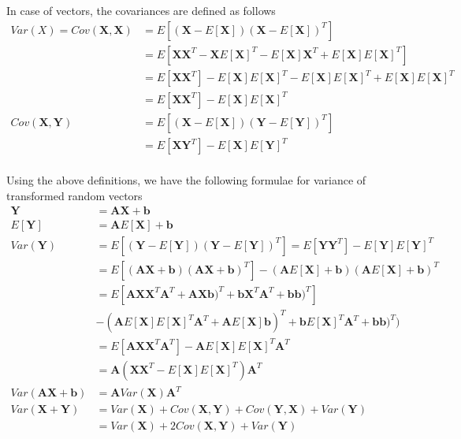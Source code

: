 \documentclass[../probability-notes.tex]{subfiles}
\begin{document}
    In case of vectors, the covariances are defined as follows
    \begin{align*}
        Var(X) = Cov(\mathbf{X}, \mathbf{X}) &= E[(\mathbf{X} - E[\mathbf{X}])(\mathbf{X} - E[\mathbf{X}])^{T}]\\
        &= E[\mathbf{X}\mathbf{X}^{T} - \mathbf{X}E[\mathbf{X}]^{T} - E[\mathbf{X}]\mathbf{X}^{T} + E[\mathbf{X}]E[\mathbf{X}]^{T}]\\
        &= E[\mathbf{X}\mathbf{X}^{T}] - E[\mathbf{X}]E[\mathbf{X}]^{T} - E[\mathbf{X}]E[\mathbf{X}]^{T} + E[\mathbf{X}]E[\mathbf{X}]^{T}\\
        &= E[\mathbf{X} \mathbf{X}^{T}] - E[\mathbf{X}]E[\mathbf{X}]^{T}\\
        Cov(\mathbf{X}, \mathbf{Y}) &= E[(\mathbf{X} - E[\mathbf{X}])(\mathbf{Y} - E[\mathbf{Y}])^{T}]\\
        &= E[\mathbf{X} \mathbf{Y}^{T}] - E[\mathbf{X}]E[\mathbf{Y}]^{T}\\
    \end{align*}

    Using the above definitions, we have the following formulae for variance of transformed random vectors
    \begin{align*}
        \mathbf{Y} &= \mathbf{A}\mathbf{X}+\mathbf{b}\\
        E[\mathbf{Y}] &= \mathbf{A}E[\mathbf{X}]+\mathbf{b}\\
        Var(\mathbf{Y}) &= E[(\mathbf{Y}-E[\mathbf{Y}])(\mathbf{Y}-E[\mathbf{Y}])^{T}] = E[\mathbf{Y}\mathbf{Y}^{T}] - E[\mathbf{Y}]E[\mathbf{Y}]^{T}\\
        &= E[(\mathbf{A}\mathbf{X}+\mathbf{b})(\mathbf{A}\mathbf{X}+\mathbf{b})^T] - (\mathbf{A}E[\mathbf{X}]+\mathbf{b})(\mathbf{A}E[\mathbf{X}]+\mathbf{b})^{T}\\
        &= E[\mathbf{A}\mathbf{X}\mathbf{X}^{T}\mathbf{A}^{T} + \mathbf{A}\mathbf{X}\mathbf{b})^T + \mathbf{b}\mathbf{X}^{T}\mathbf{A}^{T} + \mathbf{b}\mathbf{b})^T]\\ &- (\mathbf{A}E[\mathbf{X}]E[\mathbf{X}]^{T}\mathbf{A}^{T} + \mathbf{A}E[\mathbf{X}]\mathbf{b})^{T} + \mathbf{b}E[\mathbf{X}]^{T}\mathbf{A}^{T} + \mathbf{b}\mathbf{b})^T)\\
        &= E[\mathbf{A}\mathbf{X}\mathbf{X}^{T}\mathbf{A}^{T}] - \mathbf{A}E[\mathbf{X}]E[\mathbf{X}]^{T}\mathbf{A}^{T}\\ &= \mathbf{A} (\mathbf{X}\mathbf{X}^{T} - E[\mathbf{X}]E[\mathbf{X}]^{T}) \mathbf{A}^{T}\\
        Var(\mathbf{A}\mathbf{X}+\mathbf{b}) &= \mathbf{A} Var(\mathbf{X}) \mathbf{A}^{T}\\
        Var(\mathbf{X} + \mathbf{Y}) &= Var(\mathbf{X}) + Cov(\mathbf{X}, \mathbf{Y}) + Cov(\mathbf{Y}, \mathbf{X}) + Var(\mathbf{Y})\\
        &= Var(\mathbf{X}) + 2Cov(\mathbf{X}, \mathbf{Y}) + Var(\mathbf{Y})
    \end{align*}
\end{document}

